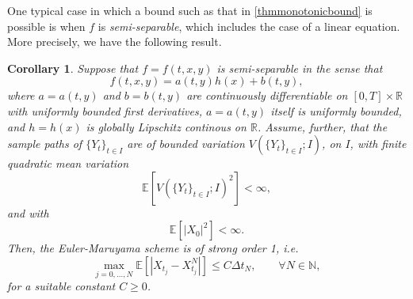 \documentclass[reqno,12pt]{amsart}
\theoremstyle{plain}%
\newtheorem{cor}{Corollary}[section]
\theoremstyle{definition}
\begin{document}
One typical case in which a bound such as that in \cref{thmmonotonicbound} is possible is when $f$ is \emph{semi-separable}, which includes the case of a linear equation. More precisely, we have the following result.

\begin{cor}
    \label{thmsemiseparablemonotonicbound}
  Suppose that $f=f(t, x, y)$ is semi-separable in the sense that
  \begin{equation}
    \label{lineareqform}
    f(t, x, y) = a(t, y)h(x) + b(t, y),
  \end{equation}
  where $a=a(t, y)$ and $b=b(t, y)$ are continuously differentiable on $[0, T]\times \mathbb{R}$ with uniformly bounded first derivatives, $a=a(t, y)$ itself is uniformly bounded, and $h=h(x)$ is globally Lipschitz continous on $\mathbb{R}$. Assume, further, that the sample paths of $\{Y_t\}_{t\in I}$ are of bounded variation $V(\{Y_t\}_{t\in I}; I)$, on $I$, with finite quadratic mean variation
  \begin{equation}
    \label{EYtboundedsquarevariation}
    \mathbb{E}[V(\{Y_t\}_{t\in I}; I)^2] < \infty,
  \end{equation}
  and with
  \begin{equation}
    \label{EX0square}
    \mathbb{E}[|X_0|^2] < \infty.
  \end{equation}
  Then, the Euler-Maruyama scheme is of strong order 1, i.e.
  \begin{equation}
    \max_{j=0, \ldots, N}\mathbb{E}\left[ \left| X_{t_j} - X_{t_j}^N \right| \right] \leq C \Delta t_N, \qquad \forall N \in \mathbb{N},
  \end{equation}
  for a suitable constant $C \geq 0$.
\end{cor}
\end{document}
